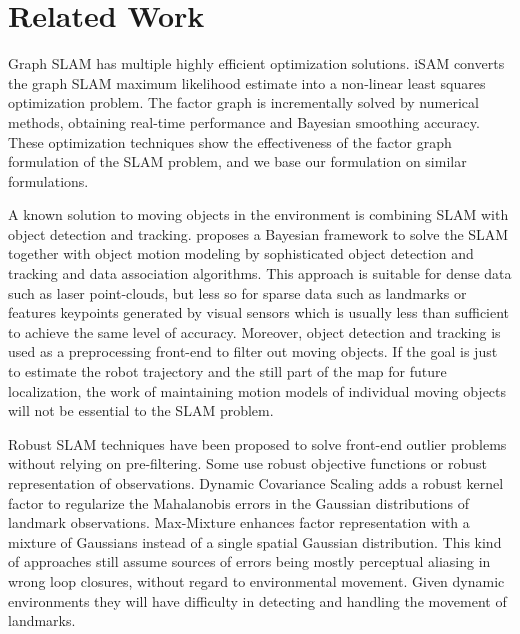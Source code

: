\section{Related Work}

Graph SLAM has multiple highly efficient optimization solutions.
iSAM \cite{isam} converts the graph SLAM maximum likelihood estimate into a
non-linear least squares optimization problem.  The factor graph is incrementally solved by numerical methods, obtaining real-time performance and Bayesian smoothing accuracy. These optimization techniques show the effectiveness of the factor graph formulation of the SLAM problem, and we base our formulation on similar formulations.


A known solution to moving objects in the environment is combining SLAM with
object detection and tracking. \cite{wang2003online} proposes a Bayesian
framework to solve the SLAM together with object motion modeling by
sophisticated object detection and tracking and data association algorithms.
This approach is suitable for dense data such as laser point-clouds, but less
so for sparse data such as landmarks or features keypoints generated by visual
sensors which is usually less than sufficient to achieve the same level of
accuracy.  Moreover, object detection and tracking is used as a preprocessing
front-end to filter out moving objects. If the goal is just to estimate the
robot trajectory and the still part of the map for future localization, the
work of maintaining motion models of individual moving objects will not be
essential to the SLAM problem. 

Robust SLAM techniques have been proposed to solve front-end outlier problems
without relying on pre-filtering. Some use robust objective functions or robust
representation of observations. Dynamic Covariance Scaling\cite{DCS} adds a
robust kernel factor to regularize the Mahalanobis errors in the Gaussian
distributions of landmark observations.  Max-Mixture\cite{mm} enhances factor
representation with a mixture of Gaussians instead of a single spatial Gaussian
distribution. This kind of approaches still assume sources of errors being
mostly perceptual aliasing in wrong loop closures, without regard to
environmental movement.  Given dynamic environments they will have difficulty
in detecting and handling the movement of landmarks.

